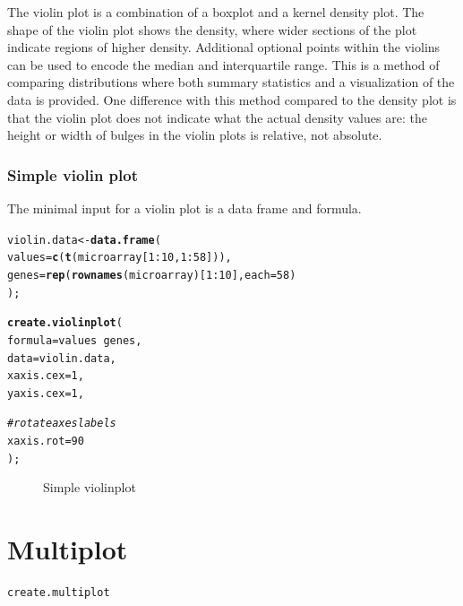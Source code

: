 \documentclass[letterpaper]{report}\usepackage[]{graphicx}\usepackage[]{color}
\makeatletter
\newcommand{\hlnum}[1]{\textcolor[rgb]{0.686,0.059,0.569}{#1}}%
\newcommand{\hlcom}[1]{\textcolor[rgb]{0.678,0.584,0.686}{\textit{#1}}}%
\newcommand{\hlopt}[1]{\textcolor[rgb]{0,0,0}{#1}}%
\newcommand{\hlstd}[1]{\textcolor[rgb]{0.345,0.345,0.345}{#1}}%
\newcommand{\hlkwb}[1]{\textcolor[rgb]{0.69,0.353,0.396}{#1}}%
\newcommand{\hlkwc}[1]{\textcolor[rgb]{0.333,0.667,0.333}{#1}}%
\newcommand{\hlkwd}[1]{\textcolor[rgb]{0.737,0.353,0.396}{\textbf{#1}}}%
\newenvironment{kframe}{%
 \def\at@end@of@kframe{}%
 \ifinner\ifhmode%
  \def\at@end@of@kframe{\end{minipage}}%
  \begin{minipage}{\columnwidth}%
 \fi\fi%
 \def\FrameCommand##1{\hskip\@totalleftmargin \hskip-\fboxsep
 \colorbox{shadecolor}{##1}\hskip-\fboxsep
     \hskip-\linewidth \hskip-\@totalleftmargin \hskip\columnwidth}%
 \MakeFramed {\advance\hsize-\width
   \@totalleftmargin\z@ \linewidth\hsize
   \@setminipage}}%
 {\par\unskip\endMakeFramed%
 \at@end@of@kframe}
\newenvironment{knitrout}{}{} %
\makeatother
\begin{document}
The violin plot is a combination of a boxplot and a kernel density plot. The shape of the violin plot shows the density, where wider sections of the plot indicate regions of higher density. Additional optional points within the violins can be used to encode the median and interquartile range. This is a method of comparing distributions where both summary statistics and a visualization of the data is provided. One difference with this method compared to the density plot is that the violin plot does not indicate what the actual density values are: the height or width of bulges in the violin plots is relative, not absolute.

\subsubsection{Simple violin plot}
The minimal input for a violin plot is a data frame and formula.
\begin{knitrout}
\color{fgcolor}\begin{kframe}
\begin{alltt}
\hlstd{violin.data} \hlkwb{<-} \hlkwd{data.frame}\hlstd{(}
    \hlkwc{values} \hlstd{=} \hlkwd{c}\hlstd{(}\hlkwd{t}\hlstd{(microarray[}\hlnum{1}\hlopt{:}\hlnum{10}\hlstd{,} \hlnum{1}\hlopt{:}\hlnum{58}\hlstd{])),}
    \hlkwc{genes} \hlstd{=} \hlkwd{rep}\hlstd{(}\hlkwd{rownames}\hlstd{(microarray)[}\hlnum{1}\hlopt{:}\hlnum{10}\hlstd{],} \hlkwc{each} \hlstd{=} \hlnum{58}\hlstd{)}
    \hlstd{);}

\hlkwd{create.violinplot}\hlstd{(}
    \hlkwc{formula} \hlstd{= values} \hlopt{~} \hlstd{genes,}
    \hlkwc{data} \hlstd{= violin.data,}
        \hlkwc{xaxis.cex} \hlstd{=} \hlnum{1}\hlstd{,}
        \hlkwc{yaxis.cex} \hlstd{=} \hlnum{1}\hlstd{,}

    \hlcom{# rotate axes labels}
    \hlkwc{xaxis.rot} \hlstd{=} \hlnum{90}
    \hlstd{);}
\end{alltt}
\end{kframe}\begin{figure}

{\centering {} 

}

\caption[Simple violinplot]{Simple violinplot}\label{fig:violinplot}
\end{figure}


\end{knitrout}

\section{Multiplot}
\begin{verbatim}
create.multiplot
\end{verbatim}
\end{document}
